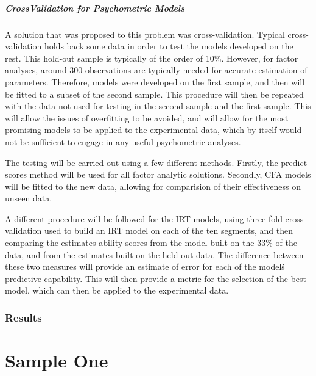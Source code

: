 \documentclass{article}
\begin{document}
\subsubsection{CrossValidation for Psychometric Models}
\label{sec:crossv-psych-models}

 A solution that was proposed to this problem was cross-validation.  Typical cross-validation holds back some data in order to test the models developed on the rest.  This hold-out sample is typically of the order of 10\%.  However, for factor analyses, around 300 observations are typically needed for accurate estimation of parameters.  Therefore, models were developed on the first sample, and then will be fitted to a subset of the second sample.  This procedure will then be repeated with the data not used for testing in the second sample and the first sample.  This will allow the issues of overfitting to be avoided, and will allow for the most promising models to be applied to the experimental data, which by itself would not be sufficient to engage in any useful psychometric analyses.


The testing will be carried out using a few different methods.  Firstly, the predict scores method will be used for all factor analytic solutions.  Secondly,  CFA models will be fitted to the new data, allowing for comparision of their effectiveness on unseen data.  

A different procedure will be followed for the IRT models, using  three fold cross validation used to build an IRT model on each of the ten segments, and then comparing the estimates ability scores from the model built on the 33\% of the data, and from the estimates built on the held-out data. The difference between these two measures will provide an estimate of error for each of the model\'s predictive capability. This will then provide a metric for the selection of the best model, which can then be applied to the experimental data. 


\section{Results}


\part{Sample One}

\end{document}
